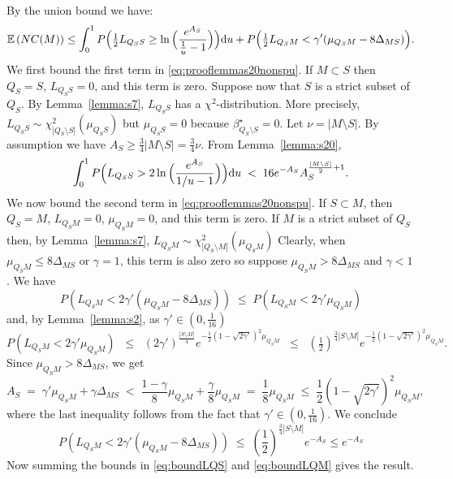 \documentclass[aos]{imsart}
\theoremstyle{plain}
\newcommand{\E}{\mathbb{E}}
\begin{document}
\begin{supplement}
$$$$
By the union bound we have:
\begin{equation}\label{eq:prooflemmas20nonspu}
    \E\left(NC(M)\right)  \leq \int_0^1P\Bigl(\tfrac12 L_{Q_SS}\geq \ln{\Bigl(\frac{e^{A_S}}{\tfrac1u-1}\Bigl)}\Bigl){\rm d}u+ P\Bigl(\tfrac12 L_{Q_SM}<\gamma'(\mu_{Q_SM}-8\Delta_{MS})\Bigl).
\end{equation}
We first bound the first term in \eqref{eq:prooflemmas20nonspu}. If $M \subset S$ then $Q_S=S$, $L_{Q_SS}=0$, and this term is zero. Suppose now that $S$ is a strict subset of $Q_S$. By Lemma~\ref{lemma:s7}, $L_{Q_SS}$ has a  $\chi^2$-distribution. More precisely, $L_{Q_SS} \sim \mathcal{\chi}_{|Q_S\setminus S|}^2(\mu_{Q_SS})$ {but $\mu_{Q_SS}=0$ because $\beta^\star_{Q_S\setminus S}=0$}. Let $\nu=|M\setminus S|$. By assumption we have $A_S \geq \tfrac34|M\setminus S|=\tfrac34\nu$. From Lemma~\ref{lemma:s20},
\begin{equation}\label{eq:boundLQS}
\int_0^1P\Bigl(L_{Q_SS}>2\ln{\Bigl(\frac{e^{A_S}}{1 / u-1}\Bigl)}\Bigl){\rm d}u \;<\; 16
e^{-A_S}A_S^{\frac{|M\setminus S|}{2}+1}.
\end{equation}
We now bound the second term in \eqref{eq:prooflemmas20nonspu}. If $S \subset M$, then $Q_S=M$, $L_{Q_SM}=0$, $\mu_{Q_SM}=0$, and this term is zero. If $M$ is a strict subset of $Q_S$ then, by Lemma~\ref{lemma:s7}, $L_{Q_SM} \sim \chi_{|Q_S\setminus M|}^2(\mu_{Q_SM})$ %
Clearly, when $\mu_{Q_SM}\leq 8\Delta_{MS}$ or $\gamma = 1$, this term is also zero so suppose  $\mu_{Q_SM}> 8\Delta_{MS}$ and $\gamma <1$.  
We have  
$$P\left(L_{Q_SM}<2\gamma'(\mu_{Q_SM}-8\Delta_{MS})\right)\; \leq \; P\left(L_{Q_SM}<2\gamma'\mu_{Q_SM}\right)$$ 
and, by Lemma~\ref{lemma:s2}, as $\gamma'\in (0,\tfrac{1}{16})$
$$P\left(L_{Q_SM}<2\gamma'\mu_{Q_SM}\right) \;\;\leq\;\; (2\gamma')^{\frac{|S\setminus M|}{4}} e^{-\frac{1}{2}(1-\sqrt{2\gamma'})^2\mu_{Q_SM}}\;\;\leq\;\;  (\tfrac12)^{\tfrac34|S\setminus M|}e^{-\frac{1}{2}(1-\sqrt{2\gamma'})^2\mu_{Q_SM}}.$$
Since $\mu_{Q_SM}>8\Delta_{MS}$, we get
$$
A_S\;=\;\gamma'\mu_{Q_SM}+\gamma\Delta_{MS}\;<\;\frac{1-\gamma}{8}\mu_{Q_SM}+\frac{\gamma}{8}\mu_{Q_SM}\;=\;\frac18\mu_{Q_SM}\;\leq\;\frac12(1-\sqrt{2\gamma'})^2\mu_{Q_SM},
$$
where the last inequality follows from the fact that $\gamma'\in(0, \tfrac{1}{16})$. We conclude
\begin{equation}\label{eq:boundLQM}
    P\left(L_{Q_SM}<2\gamma'(\mu_{Q_SM}-8\Delta_{MS})\right) \;\leq\; \left(\frac12\right)^{\tfrac34|S\setminus M|}e^{-A_S} \leq e^{-A_S}
\end{equation}
Now summing the bounds in \eqref{eq:boundLQS} and \eqref{eq:boundLQM} gives the result.


\end{supplement}
\end{document}
